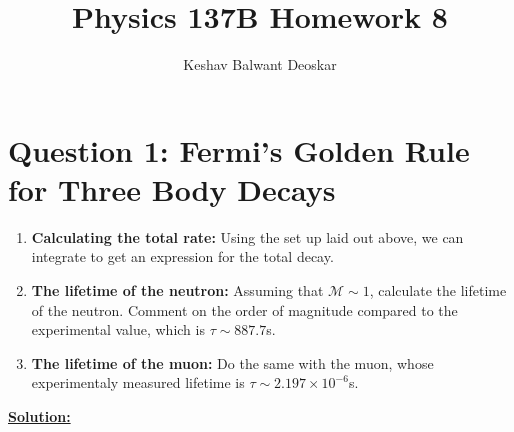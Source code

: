 \documentclass{article}
\title{Physics 137B Homework 8}
\author{Keshav Balwant Deoskar}
\begin{document}
\maketitle


\section*{Question 1: Fermi's Golden Rule for Three Body Decays} 
\begin{enumerate}[label=(\alph*)]
  \item \textbf{Calculating the total rate:} Using the set up laid out above, we can integrate to get an expression for the total decay.
  \item \textbf{The lifetime of the neutron:} Assuming that $\mathcal{M} \sim 1$, calculate the lifetime of the neutron. Comment on the order of magnitude compared to the experimental value, which is $\tau \sim 887.7$s.
  \item \textbf{The lifetime of the muon:} Do the same with the muon, whose experimentaly measured lifetime is $\tau \sim 2.197 \times 10^{-6}$s.
\end{enumerate}

\vskip 0.5cm
\underline{\textbf{Solution:}} 
\end{document}
